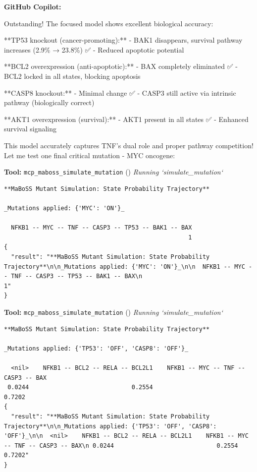 \documentclass[11pt,a4paper]{article}
\begin{document}
\begin{copilotbox}
\textbf{GitHub Copilot:}

Outstanding! The focused model shows excellent biological accuracy:

**TP53 knockout (cancer-promoting):**
- BAK1 disappears, survival pathway increases (2.9\% → 23.8\%) ✅
- Reduced apoptotic potential

**BCL2 overexpression (anti-apoptotic):**  
- BAX completely eliminated ✅
- BCL2 locked in all states, blocking apoptosis

**CASP8 knockout:**
- Minimal change ✅  
- CASP3 still active via intrinsic pathway (biologically correct)

**AKT1 overexpression (survival):**
- AKT1 present in all states ✅
- Enhanced survival signaling

This model accurately captures TNF's dual role and proper pathway competition! Let me test one final critical mutation - MYC oncogene:

\end{copilotbox}
\begin{toolokbox}
\textbf{Tool:} \texttt{mcp\_maboss\_simulate\_mutation} (\checkmark)
\textit{Running `simulate\_mutation`}
\begin{lstlisting}
**MaBoSS Mutant Simulation: State Probability Trajectory**

_Mutations applied: {'MYC': 'ON'}_

  NFKB1 -- MYC -- TNF -- CASP3 -- TP53 -- BAK1 -- BAX
                                                    1
{
  "result": "**MaBoSS Mutant Simulation: State Probability Trajectory**\n\n_Mutations applied: {'MYC': 'ON'}_\n\n  NFKB1 -- MYC -- TNF -- CASP3 -- TP53 -- BAK1 -- BAX\n                                                    1"
}
\end{lstlisting}
\end{toolokbox}
\begin{toolokbox}
\textbf{Tool:} \texttt{mcp\_maboss\_simulate\_mutation} (\checkmark)
\textit{Running `simulate\_mutation`}
\begin{lstlisting}
**MaBoSS Mutant Simulation: State Probability Trajectory**

_Mutations applied: {'TP53': 'OFF', 'CASP8': 'OFF'}_

  <nil>    NFKB1 -- BCL2 -- RELA -- BCL2L1    NFKB1 -- MYC -- TNF -- CASP3 -- BAX
 0.0244                             0.2554                                 0.7202
{
  "result": "**MaBoSS Mutant Simulation: State Probability Trajectory**\n\n_Mutations applied: {'TP53': 'OFF', 'CASP8': 'OFF'}_\n\n  <nil>    NFKB1 -- BCL2 -- RELA -- BCL2L1    NFKB1 -- MYC -- TNF -- CASP3 -- BAX\n 0.0244                             0.2554                                 0.7202"
}
\end{lstlisting}
\end{toolokbox}
\end{document}
